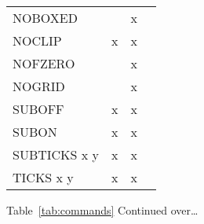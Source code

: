 \begin{center}
\begin{tabular}{lccc}
NOBOXED                          &           &     x  &                    \\
NOCLIP                           &     x     &     x  &                    \\
NOFZERO                          &           &     x  &                    \\
NOGRID                           &           &     x  &                    \\
SUBOFF                           &     x     &     x  &                    \\
SUBON                            &     x     &     x  &                    \\
SUBTICKS  x   y                  &     x     &     x  &                    \\
TICKS  x   y                     &     x     &     x  &                    \\ \hline
\end{tabular}
\normalsize
\end{center}
Table~\ref{tab:commands} Continued over\ldots

